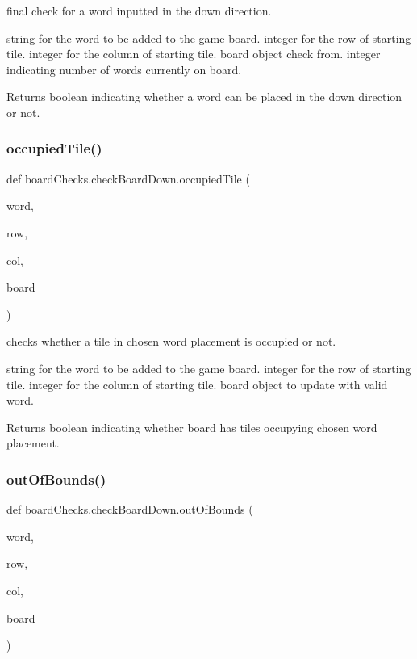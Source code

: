 final check for a word inputted in the down direction. 

string for the word to be added to the game board.  integer for the row of starting tile.  integer for the column of starting tile.  board object check from.  integer indicating number of words currently on board. \begin{DoxyReturn}{Returns}
boolean indicating whether a word can be placed in the down direction or not. 
\end{DoxyReturn}
\mbox{\label{classboard_checks_1_1check_board_down_a8359646cbfe4164fbb3dc7e62d1ce8a2}} 
\subsubsection{\texorpdfstring{occupied\+Tile()}{occupiedTile()}}
{\footnotesize\ttfamily def board\+Checks.\+check\+Board\+Down.\+occupied\+Tile (\begin{DoxyParamCaption}\item[{}]{word,  }\item[{}]{row,  }\item[{}]{col,  }\item[{}]{board }\end{DoxyParamCaption})}



checks whether a tile in chosen word placement is occupied or not. 

string for the word to be added to the game board.  integer for the row of starting tile.  integer for the column of starting tile.  board object to update with valid word. \begin{DoxyReturn}{Returns}
boolean indicating whether board has tiles occupying chosen word placement. 
\end{DoxyReturn}
\mbox{\label{classboard_checks_1_1check_board_down_a8e340fd1c90c5ba81d0d37c3a3627f93}} 
\subsubsection{\texorpdfstring{out\+Of\+Bounds()}{outOfBounds()}}
{\footnotesize\ttfamily def board\+Checks.\+check\+Board\+Down.\+out\+Of\+Bounds (\begin{DoxyParamCaption}\item[{}]{word,  }\item[{}]{row,  }\item[{}]{col,  }\item[{}]{board }\end{DoxyParamCaption})}



